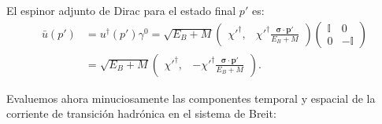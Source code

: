 \documentclass[10pt,a4paper]{article}
\begin{document}
El espinor adjunto de Dirac para el estado final $p'$ es:
\begin{align}
\bar{u}(p') &= u^\dagger(p') \gamma^0 = \sqrt{E_B + M} \begin{pmatrix} \chi'^\dagger, & \chi'^\dagger \frac{\boldsymbol{\sigma} \cdot \mathbf{p}'}{E_B + M} \end{pmatrix} \begin{pmatrix} \mathbb{I} & 0 \\ 0 & -\mathbb{I} \end{pmatrix} \nonumber \\
&= \sqrt{E_B + M} \begin{pmatrix} \chi'^\dagger, & -\chi'^\dagger \frac{\boldsymbol{\sigma} \cdot \mathbf{p}'}{E_B + M} \end{pmatrix}.
\end{align}

Evaluemos ahora minuciosamente las componentes temporal y espacial de la corriente de transición hadrónica en el sistema de Breit:
\end{document}
